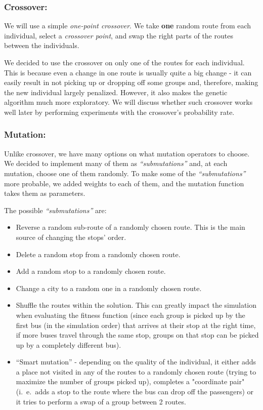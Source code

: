 \subsubsection*{Crossover:}

We will use a simple \textit{one-point crossover}. We take \textbf{one} random route from each individual, select a \textit{crossover point}, and swap the right parts of the routes between the individuals.

We decided to use the crossover on only one of the routes for each individual. This is because even a change in one route is usually quite a big change - it can easily result in not picking up or dropping off some groups and, therefore, making the new individual largely penalized. However, it also makes the genetic algorithm much more exploratory. We will discuss whether such crossover works well later by performing experiments with the crossover's probability rate.

\subsubsection*{Mutation:}

Unlike crossover, we have many options on what mutation operators to choose. We decided to implement many of them as \textit{``submutations''} and, at each mutation, choose one of them randomly. To make some of the \textit{``submutations''} more probable, we added weights to each of them, and the mutation function takes them as parameters. 

The possible \textit{``submutations''} are:
\begin{itemize}
    \setlength\itemsep{0pt}
    \item Reverse a random sub-route of a randomly chosen route. This is the main source of changing the stops' order.
    \item Delete a random stop from a randomly chosen route.
    \item Add a random stop to a randomly chosen route.
    \item Change a city to a random one in a randomly chosen route.
    \item Shuffle the routes within the solution. This can greatly impact the simulation when evaluating the fitness function (since each group is picked up by the first bus (in the simulation order) that arrives at their stop at the right time, if more buses travel through the same stop, groups on that stop can be picked up by a completely different bus).
    \item ``Smart mutation'' - depending on the quality of the individual, it either adds a place not visited in any of the routes to a randomly chosen route (trying to maximize the number of groups picked up), completes a "coordinate pair" (i.\ e.\ adds a stop to the route where the bus can drop off the passengers) or it tries to perform a swap of a group between 2 routes.
\end{itemize}

